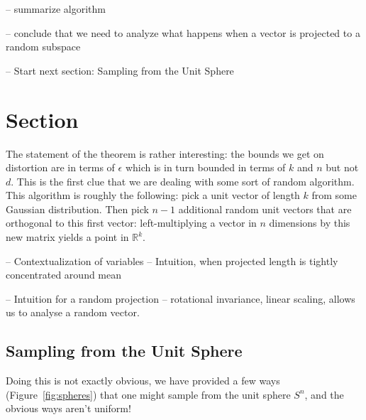 \documentclass[11pt]{article}
\begin{document}
-- summarize algorithm

-- conclude that we need to analyze what happens when a vector is projected to a random subspace

-- Start next section: Sampling from the Unit Sphere


\section{Section}


The statement of the theorem is rather interesting: the bounds we get on
distortion are in terms of $\epsilon$ which is in turn bounded in terms of $k$
and $n$ but not $d$. This is the first clue that we are dealing with some sort
of random algorithm. This algorithm is roughly the following: pick a unit vector
of length $k$ from some Gaussian distribution. Then pick $n-1$ additional random
unit vectors that are orthogonal to this first vector: left-multiplying a vector
in $n$ dimensions by this new matrix yields a point in $\mathbb{R}^k$.

-- Contextualization of variables
-- Intuition, when projected length is tightly concentrated around mean

-- Intuition for a random projection
-- rotational invariance, linear scaling, allows us to analyse a random vector.

\subsection{Sampling from the Unit Sphere}

Doing this is not exactly obvious, we have provided a few ways
(Figure~\ref{fig:spheres}) that one might sample from the unit sphere $S^n$, and
the obvious ways aren't uniform!
\end{document}

